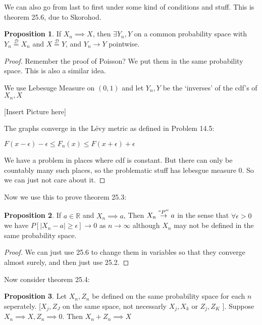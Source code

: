 \documentclass{article}
\theoremstyle{definition}
\newtheorem{proposition}{Proposition}
\begin{document}
We can also go from last to first under some kind of conditions and stuff. This is theorem 25.6, due to Skorohod.

\begin{proposition}

    If \(X_n \implies X\), then \(\exists Y_n,Y\) on a common probability space with \(Y_n \overset{\mathcal{D}}{=} X_n\) and \(X \overset{\mathcal{D}}{=} Y\), and \(Y_n \to Y \) pointwise.

\end{proposition}

\begin{proof}
    
    Remember the proof of Poisson? We put them in the same probability space. This is also a similar idea.

    We use Lebesuge Measure on \((0,1)\) and let \(Y_n,Y\) be the `inverses' of the cdf's of \(X_n,X\)
    
    [Insert Picture here]

    The graphs converge in the L\'evy metric as defined in Problem 14.5:

    \(F(x-\epsilon)-\epsilon \leq F_n(x) \leq F(x+\epsilon) +\epsilon\) 

    We have a problem in places where cdf is constant. But there can only be countably many such places, so the problematic stuff has lebesgue measure \(0\). So we can just not care about it.

\end{proof}

Now we use this to prove theorem 25.3:

\begin{proposition}
    If \(a\in\mathbb{R}\) and \(X_n \implies a\), Then \(X_n \overset{``P''}{\to } a\) in the sense that \(\forall \epsilon >0\) we have \(P[\vert X_n - a  \vert \geq \epsilon ] \to 0\) as \(n\to \infty\) although \(X_n\) may not be defined in the same probability space. 
\end{proposition}

\begin{proof}
    We can just use 25.6 to change them in variables so that they converge almost surely, and then just use 25.2.
\end{proof}

Now consider theorem 25.4:

\begin{proposition}
    Let \(X_n,Z_n\) be defined on the same probability space for each \(n\) seperately. [\(X_j,Z_J\) on the same space, not necessarly \(X_j,X_k\) or \(Z_j,Z_K\) ]. Suppose \(X_n \implies X, Z_n \implies 0\). Then \(X_n + Z_n \implies X\)
\end{proposition}
\end{document}
